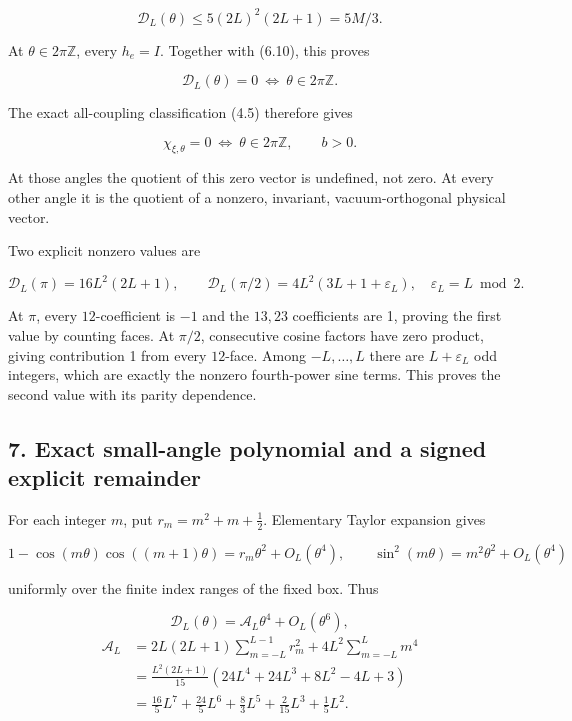 \documentclass[
  11pt,
]{article}
\begin{document}
\[
\mathcal D_L(\theta)\le5(2L)^2(2L+1)=5M/3.
\tag{6.11}
\]

At \(\theta\in2\pi\mathbb Z\), every \(h_e=I\). Together with (6.10),
this proves

\[
\mathcal D_L(\theta)=0\ \Longleftrightarrow\ \theta\in2\pi\mathbb Z.
\tag{6.12}
\]

The exact all-coupling classification (4.5) therefore gives

\[
\boxed{\chi_{\xi,\theta}=0\ \Longleftrightarrow\
\theta\in2\pi\mathbb Z,\qquad b>0.}
\tag{6.13}
\]

At those angles the quotient of this zero vector is undefined, not zero.
At every other angle it is the quotient of a nonzero, invariant,
vacuum-orthogonal physical vector.

Two explicit nonzero values are

\[
\mathcal D_L(\pi)=16L^2(2L+1),\qquad
\mathcal D_L(\pi/2)=4L^2(3L+1+\varepsilon_L),\quad
\varepsilon_L=L\bmod2.
\tag{6.14}
\]

At \(\pi\), every \(12\)-coefficient is \(-1\) and the \(13,23\)
coefficients are 1, proving the first value by counting faces. At
\(\pi/2\), consecutive cosine factors have zero product, giving
contribution 1 from every \(12\)-face. Among \(-L,\ldots,L\) there are
\(L+\varepsilon_L\) odd integers, which are exactly the nonzero
fourth-power sine terms. This proves the second value with its parity
dependence.

\subsection{7. Exact small-angle polynomial and a signed explicit
remainder}\label{magnetic-part-2-exact-small-angle-polynomial-and-a-signed-explicit-remainder}

For each integer \(m\), put \(r_m=m^2+m+\tfrac12\). Elementary Taylor
expansion gives

\[
1-\cos(m\theta)\cos((m+1)\theta)=r_m\theta^2+O_L(\theta^4),
\qquad \sin^2(m\theta)=m^2\theta^2+O_L(\theta^4)
\tag{7.1}
\]

uniformly over the finite index ranges of the fixed box. Thus

\[
\mathcal D_L(\theta)=\mathcal A_L\theta^4+O_L(\theta^6),
\] \[
\begin{split}
\mathcal A_L
&=2L(2L+1)\sum_{m=-L}^{L-1}r_m^2+4L^2\sum_{m=-L}^{L}m^4\\
&=\boxed{\frac{L^2(2L+1)}{15}
(24L^4+24L^3+8L^2-4L+3)}\\
&=\frac{16}{5}L^7+\frac{24}{5}L^6+\frac83L^5+\frac2{15}L^3+\frac15L^2.
\end{split}
\tag{7.2}
\]
\end{document}
